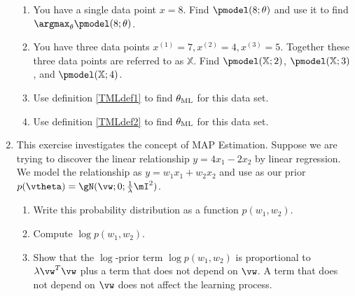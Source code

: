 \documentclass{article}
\begin{document}
\begin{enumerate}
\begin{enumerate}
        \item You have a single data point $x = 8$. Find $\pmodel(8; \theta)$ and use it to find $\argmax_\theta \pmodel(8; \theta)$.
        \item You have three data points $x^{(1)} = 7, x^{(2)} = 4, x^{(3)} = 5$. Together these three data points are referred to as $\mathbb{X}$. Find $\pmodel(\mathbb{X}; 2)$, $\pmodel(\mathbb{X}; 3)$, and $\pmodel(\mathbb{X}; 4)$.
        \item Use definition \ref{TMLdef1} to find $\theta_\textnormal{ML}$ for this data set.
        \item Use definition \ref{TMLdef2} to find $\theta_\textnormal{ML}$ for this data set.
    \end{enumerate}

\item This exercise investigates the concept of MAP Estimation. Suppose we are trying to discover the linear relationship $y = 4x_1 - 2x_2$ by linear regression. We model the relationship as $y = w_1x_1 + w_2x_2$ and use as our prior $p(\vtheta) = \gN(\vw; 0; \frac{1}{\lambda}\mI^2)$. 
    \begin{enumerate}
    \item Write this probability distribution as a function $p(w_1,w_2)$.
    \item Compute $\log p(w_1,w_2)$.
    \item Show that the $\log$-prior term $\log p(w_1,w_2)$ is proportional to $\lambda \vw^T\vw$ plus a term that does not depend on $\vw$. A term that does not depend on $\vw$ does not affect the learning process.
    \end{enumerate}


\end{enumerate}
\end{document}
